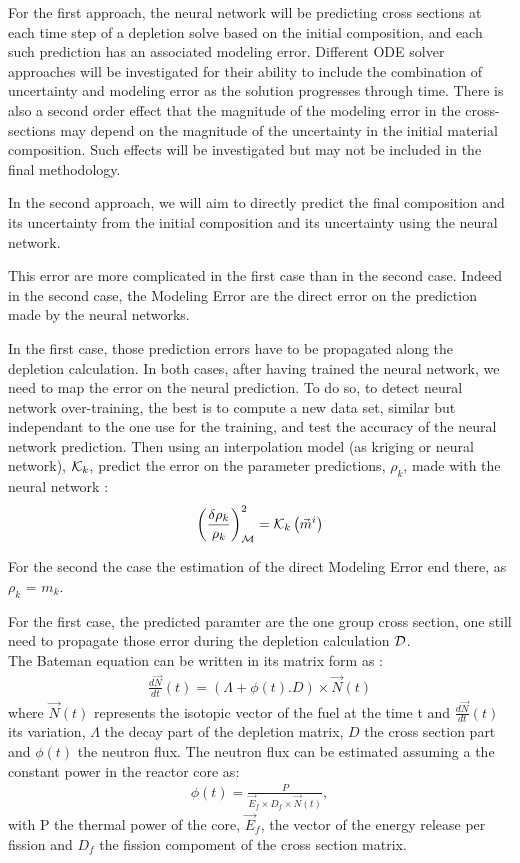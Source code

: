 \documentclass[dvips,12pt]{article}
\begin{document}
For the first approach, the neural network will be
predicting cross sections at each time step of a
depletion solve based on the initial composition,
and each such prediction has an associated
modeling error.  Different ODE solver approaches
will be investigated for their ability to include
the combination of uncertainty and modeling error
as the solution progresses through time.  There is
also a second order effect that the magnitude of
the modeling error in the cross-sections may
depend on the magnitude of the uncertainty in the
initial material composition.  Such effects will
be investigated but may not be included in the
final methodology.

In the second approach, we will aim to directly
predict the final composition and its uncertainty
from the initial composition and its uncertainty
using the neural network.


This error are more complicated in the first case
than in the second case. Indeed in the second case,
the Modeling Error are the direct error on the
prediction made by the neural networks.


In the first case, those prediction errors have to
be propagated along the depletion calculation.
In both cases, after having trained the neural
network, we need to map the error on the neural
prediction.
To do so, to detect neural network over-training,
the best is to compute a new data set, similar but
independant to the one use for the training, and
test the accuracy of the neural network prediction.
Then using an interpolation model (as kriging or
neural network), ${\cal K}_k$,  predict the error
on the parameter predictions, $\rho_k$, made with
the neural network :
\begin{align}
  \left( \frac{\delta \rho_k}{\rho_k} \right)^{2} _{{\cal M}} = {\cal K}_k \left( \vec{m}^{i} \right)
\end{align}

For the second the case the estimation of the
direct Modeling Error end there, as $\rho_k$ = $m_k$.

For the first case, the predicted paramter are the
one group cross section, one still need to
propagate those error during the depletion
calculation ${\cal D}$.\\
The Bateman equation can be written in its matrix
form as :
\begin{align}
  \frac{d\vec{N}}{dt}(t) = (\Lambda + \phi(t) . D) \times \vec{N}(t)
\end{align}
where $\vec{N}(t)$ represents the isotopic vector
of the fuel at the time t and
$\frac{d\vec{N}}{dt}(t)$ its variation, $\Lambda$
the decay part of the depletion matrix, $D$ the
cross section part and $\phi(t)$ the neutron flux.
The neutron flux can be estimated assuming a the
constant power in the reactor core as:
\begin{align}
  \phi(t) = \frac{P}{ \vec{E}_f \times D_f \times \vec{N}(t)},
\end{align}
with P the thermal power of the core, $\vec{E}_f$,
the vector of the energy release per fission and
$D_f$ the fission compoment of the cross section
matrix.
\end{document}

